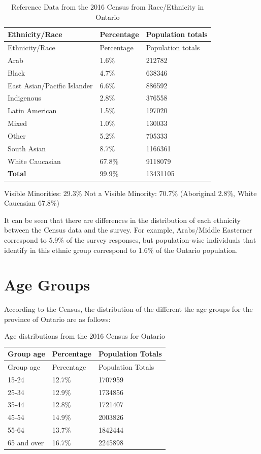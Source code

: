 \documentclass[
  letterpaper,
  DIV=11,
  numbers=noendperiod]{scrartcl}
\begin{document}
\hypertarget{tbl-races}{}
\begin{longtable}[]{@{}lll@{}}
\caption{\label{tbl-races}Reference Data from the 2016 Census from
Race/Ethnicity in Ontario}\tabularnewline
\toprule()
Ethnicity/Race & Percentage & Population totals \\
\midrule()
\endfirsthead
\toprule()
Ethnicity/Race & Percentage & Population totals \\
\midrule()
\endhead
Arab & 1.6\% & 212782 \\
Black & 4.7\% & 638346 \\
East Asian/Pacific Islander & 6.6\% & 886592 \\
Indigenous & 2.8\% & 376558 \\
Latin American & 1.5\% & 197020 \\
Mixed & 1.0\% & 130033 \\
Other & 5.2\% & 705333 \\
South Asian & 8.7\% & 1166361 \\
White Caucasian & 67.8\% & 9118079 \\
\textbf{Total} & 99.9\% & 13431105 \\
\bottomrule()
\end{longtable}

Visible Minorities: 29.3\% Not a Visible Minority: 70.7\% (Aboriginal
2.8\%, White Caucasian 67.8\%)

It can be seen that there are differences in the distribution of each
ethnicity between the Census data and the survey. For example,
Arabs/Middle Easterner correspond to 5.9\% of the survey responses, but
population-wise individuals that identify in this ethnic group
correspond to 1.6\% of the Ontario population.

\hypertarget{age-groups}{%
\section{Age Groups}\label{age-groups}}

According to the Census, the distribution of the different the age
groups for the province of Ontario are as follows:

\begin{longtable}[]{@{}lll@{}}
\caption{Age distributions from the 2016 Census for
Ontario}\tabularnewline
\toprule()
Group age & Percentage & Population Totals \\
\midrule()
\endfirsthead
\toprule()
Group age & Percentage & Population Totals \\
\midrule()
\endhead
15-24 & 12.7\% & 1707959 \\
25-34 & 12.9\% & 1734856 \\
35-44 & 12.8\% & 1721407 \\
45-54 & 14.9\% & 2003826 \\
55-64 & 13.7\% & 1842444 \\
65 and over & 16.7\% & 2245898 \\
\bottomrule()
\end{longtable}
\end{document}
